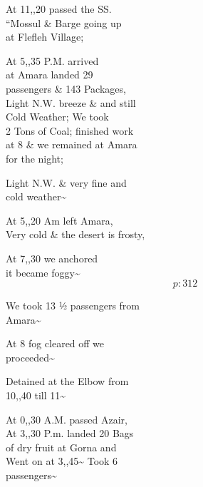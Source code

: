 \documentclass{report}
\begin{document}
	\par{
 	At 11,,20 passed the SS.\ \\“Mossul \& Barge going up\ \\at Flefleh Village;\ \\
	}

	\par{
 	At 5,,35 P.M. arrived\ \\at Amara landed 29\ \\passengers \& 143 Packages,\ \\Light N.W. breeze \& and still\ \\Cold Weather; We took\ \\2 Tons of Coal; finished work\ \\at 8 \& we remained at Amara\ \\for the night;\ \\
	}

	\par{
 	Light N.W. \& very fine and\ \\cold weather\~{}\ \\
	}

	\par{
 	At 5,,20 Am left Amara,\ \\Very cold \& the desert is frosty,\ \\
	}

	\par{
 	At 7,,30 we anchored\ \\it became foggy\~{}\ \\
  \[p: 312 \]

	}

	\par{
 	We took 13 ½ passengers from\ \\Amara\~{}\ \\
	}

	\par{
 	At 8 fog cleared off we\ \\proceeded\~{}\ \\
	}

	\par{
 	Detained at the Elbow from\ \\10,,40 till 11\~{}\ \\
	}

	\par{
 	At 0,,30 A.M. passed Azair,\ \\At 3,,30 P.m. landed 20 Bags\ \\of dry fruit at Gorna and\ \\Went on at 3,,45\~{} Took 6\ \\passengers\~{}\ \\
	}
\end{document}
